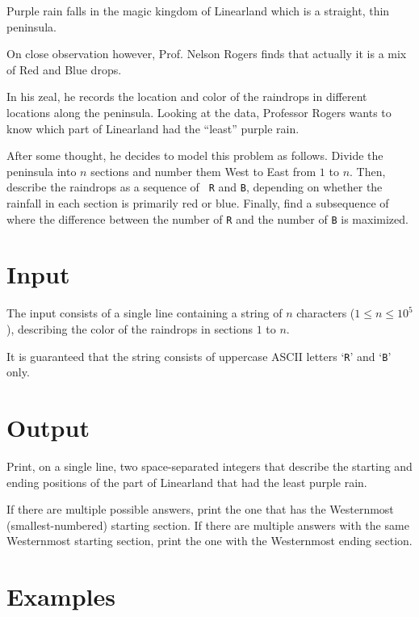 

Purple rain falls in the magic kingdom of Linearland which is a
straight, thin peninsula.

On close observation however, Prof. Nelson Rogers finds that actually
it is a mix of Red and Blue drops.

In his zeal, he records the location and color of the raindrops in
different locations along the peninsula.
Looking at the data, Professor Rogers wants to know which part of
Linearland had the ``least'' purple rain.

After some thought, he decides to model this problem as follows.
Divide the peninsula into $n$ sections and number them West to East
from $1$ to $n$.  Then, describe the raindrops as a sequence of {\tt
R} and {\tt B}, depending on whether the rainfall in each section is
primarily red or blue.  Finally, find a subsequence of where the
difference between the number of {\tt R} and the number of {\tt B} is
maximized.



\section*{Input}

The input consists of a single line containing a string of $n$
characters ($1 \le n \le 10^5$), describing the color of the raindrops
in sections $1$ to $n$.

It is guaranteed that the string consists of uppercase ASCII letters
`{\tt R}' and `{\tt B}' only.


\section*{Output}

Print, on a single line, two space-separated integers that describe
the starting and ending positions of the part of Linearland that had
the least purple rain.

If there are multiple possible answers, print the one that has the
Westernmost (smallest-numbered) starting section.  If there are multiple
answers with the same Westernmost starting section, print the one with
the Westernmost ending section.

\section*{Examples}



